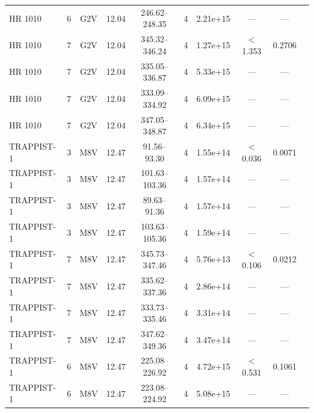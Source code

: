 \documentclass{openjournal}
\begin{document}
\begin{table}
\begin{tabularx}{\textwidth}{@{}l c c c c c c c c X@{}}
HR 1010 & 6 & G2V & 12.04 & 246.62--248.35 & 4 & 2.21e+15 & --- & --- &  \\
HR 1010 & 7 & G2V & 12.04 & 345.32--346.24 & 4 & 1.27e+15 & $<$1.353 & 0.2706 &  \\
HR 1010 & 7 & G2V & 12.04 & 335.05--336.87 & 4 & 5.33e+15 & --- & --- &  \\
HR 1010 & 7 & G2V & 12.04 & 333.09--334.92 & 4 & 6.09e+15 & --- & --- &  \\
HR 1010 & 7 & G2V & 12.04 & 347.05--348.87 & 4 & 6.34e+15 & --- & --- &  \\
TRAPPIST-1 & 3 & M8V & 12.47 & 91.56--93.30 & 4 & 1.55e+14 & $<$0.036 & 0.0071 &  \\
TRAPPIST-1 & 3 & M8V & 12.47 & 101.63--103.36 & 4 & 1.57e+14 & --- & --- &  \\
TRAPPIST-1 & 3 & M8V & 12.47 & 89.63--91.36 & 4 & 1.57e+14 & --- & --- &  \\
TRAPPIST-1 & 3 & M8V & 12.47 & 103.63--105.36 & 4 & 1.59e+14 & --- & --- &  \\
TRAPPIST-1 & 7 & M8V & 12.47 & 345.73--347.46 & 4 & 5.76e+13 & $<$0.106 & 0.0212 &  \\
TRAPPIST-1 & 7 & M8V & 12.47 & 335.62--337.36 & 4 & 2.86e+14 & --- & --- &  \\
TRAPPIST-1 & 7 & M8V & 12.47 & 333.73--335.46 & 4 & 3.31e+14 & --- & --- &  \\
TRAPPIST-1 & 7 & M8V & 12.47 & 347.62--349.36 & 4 & 3.47e+14 & --- & --- &  \\
TRAPPIST-1 & 6 & M8V & 12.47 & 225.08--226.92 & 4 & 4.72e+15 & $<$0.531 & 0.1061 &  \\
TRAPPIST-1 & 6 & M8V & 12.47 & 223.08--224.92 & 4 & 5.08e+15 & --- & --- &  \\
\hline
\end{tabularx}
\end{table}
\end{document}
